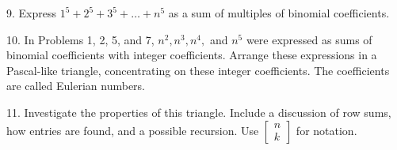 \documentclass[10pt,]{book}
\theoremstyle{plain}
\theoremstyle{definition}
\theoremstyle{definition}
\theoremstyle{definition}
\numberwithin{equation}{chapter}
\begin{document}
\begin{exerciselist}
\item[9.]\hypertarget{exercise-43}{}\hypertarget{p-1721}{}%
Express \(1^{5} + 2^{5} + 3^{5} + \ldots + n^{5}\) as a sum of multiples of binomial coefficients.%
\par\smallskip
\item[10.]\hypertarget{exercise-44}{}\hypertarget{p-1722}{}%
In Problems 1, 2, 5, and 7, \(n^{2},n^{3},n^{4},\) and \(n^{5}\) were expressed as sums of binomial coefficients with integer coefficients. Arrange these expressions in a Pascal-like triangle, concentrating on these integer coefficients. The coefficients are called Eulerian numbers.%
\par\smallskip
\item[11.]\hypertarget{exercise-45}{}\hypertarget{p-1723}{}%
Investigate the properties of this triangle. Include a discussion of row sums, how entries are found, and a possible recursion. Use \(\begin{bmatrix}
n\\
k
\end{bmatrix}\) for notation.%
\par\smallskip
\end{exerciselist}
\typeout{************************************************}
\typeout{************************************************}
\end{document}
